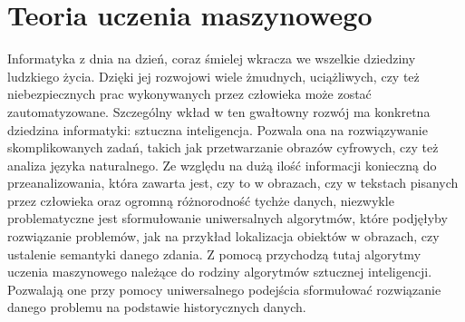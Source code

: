 \newpage
\section{Teoria uczenia maszynowego}
Informatyka z dnia na dzień, coraz śmielej wkracza we wszelkie dziedziny ludzkiego życia. Dzięki jej rozwojowi wiele żmudnych, uciążliwych, czy też niebezpiecznych prac wykonywanych przez człowieka może zostać zautomatyzowane. Szczególny wkład w ten gwałtowny rozwój ma konkretna dziedzina informatyki: sztuczna inteligencja. Pozwala ona na rozwiązywanie skomplikowanych zadań, takich jak przetwarzanie obrazów cyfrowych, czy też analiza języka naturalnego. Ze względu na dużą ilość informacji konieczną do przeanalizowania, która zawarta jest, czy to w obrazach, czy w tekstach pisanych przez człowieka oraz ogromną różnorodność tychże danych, niezwykle problematyczne jest sformułowanie uniwersalnych algorytmów, które podjęłyby rozwiązanie problemów, jak na przykład lokalizacja obiektów w obrazach, czy ustalenie semantyki danego zdania. Z pomocą przychodzą tutaj algorytmy uczenia maszynowego należące do rodziny algorytmów sztucznej inteligencji. Pozwalają one przy pomocy uniwersalnego podejścia sformułować rozwiązanie danego problemu na podstawie historycznych danych.
